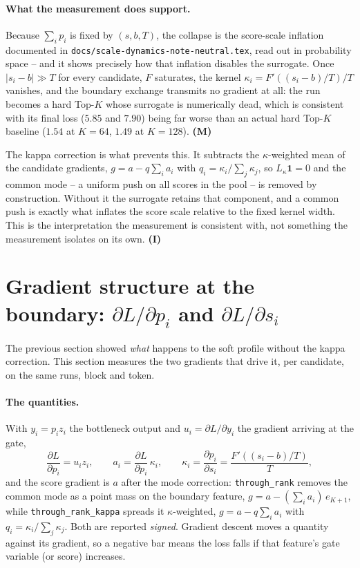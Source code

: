 \documentclass[11pt,a4paper]{article}
\newcommand{\code}[1]{\texttt{#1}}
\begin{document}
\paragraph{What the measurement does support.}
Because $\sum_i p_i$ is fixed by $(s,b,T)$, the collapse is the score-scale
inflation documented in \code{docs/scale-dynamics-note-neutral.tex}, read out
in probability space -- and it shows precisely how that inflation disables the
surrogate. Once $|s_i - b| \gg T$ for every candidate, $F$ saturates, the
kernel $\kappa_i = F'((s_i-b)/T)/T$ vanishes, and the boundary exchange
transmits no gradient at all: the run becomes a hard Top-$K$ whose surrogate
is numerically dead, which is consistent with its final loss ($5.85$ and
$7.90$) being far worse than an actual hard Top-$K$ baseline ($1.54$ at
$K=64$, $1.49$ at $K=128$). \textbf{(M)}

The kappa correction is what prevents this. It subtracts the
$\kappa$-weighted mean of the candidate gradients, $g = a - q\sum_i a_i$ with
$q_i = \kappa_i/\sum_j\kappa_j$, so $L_\kappa \mathbf 1 = 0$ and the common
mode -- a uniform push on all scores in the pool -- is removed by
construction. Without it the surrogate retains that component, and a common
push is exactly what inflates the score scale relative to the fixed kernel
width. This is the interpretation the measurement is consistent with, not
something the measurement isolates on its own. \textbf{(I)}

\section{Gradient structure at the boundary: $\partial L/\partial p_i$ and
$\partial L/\partial s_i$}

The previous section showed \emph{what} happens to the soft profile without
the kappa correction. This section measures the two gradients that drive it,
per candidate, on the same runs, block and token.

\paragraph{The quantities.}
With $y_i = p_i z_i$ the bottleneck output and $u_i = \partial L/\partial y_i$
the gradient arriving at the gate,
\[
\frac{\partial L}{\partial p_i} = u_i z_i,
\qquad
a_i = \frac{\partial L}{\partial p_i}\,\kappa_i,
\qquad
\kappa_i = \frac{\partial p_i}{\partial s_i} = \frac{F'((s_i-b)/T)}{T},
\]
and the score gradient is $a$ after the mode correction: \code{through\_rank}
removes the common mode as a point mass on the boundary feature,
$g = a - (\sum_i a_i)\,e_{K+1}$, while \code{through\_rank\_kappa} spreads it
$\kappa$-weighted, $g = a - q\sum_i a_i$ with $q_i = \kappa_i/\sum_j\kappa_j$.
Both are reported \emph{signed}. Gradient descent moves a quantity against
its gradient, so a negative bar means the loss falls if that feature's gate
variable (or score) increases.
\end{document}
